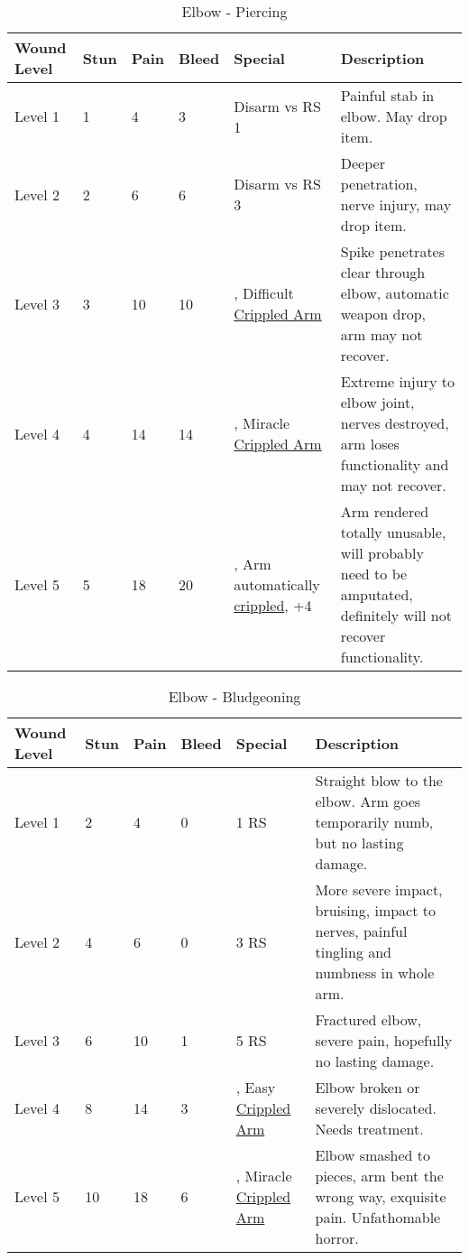\documentclass[oneside,11pt,english]{book}
\begin{document}
\begin{table}[!hb] %
	\caption{Elbow - Piercing}
	\label{wound:Elbow - Piercing}
	\begin{tabu} to 
Wound Level &Stun &Pain &Bleed &Special &Description\\\toprule
Level 1& 1& 4& 3& Disarm vs RS 1 &Painful stab in elbow. May drop item.\\
Level 2& 2& 6& 6& Disarm vs RS 3 &Deeper penetration, nerve injury, may drop item.\\
Level 3& 3& 10& 10& , \newline
	Difficult~ \hyperref[bane:Crippled Limb/Appendage]{Crippled Arm} &Spike penetrates clear through elbow, automatic weapon drop, arm may not recover.\\
Level 4& 4& 14& 14& , \newline
	Miracle~ \hyperref[bane:Crippled Limb/Appendage]{Crippled Arm} &Extreme injury to elbow joint, nerves destroyed, arm loses functionality and may not recover.\\
Level 5& 5& 18& 20& , \newline
	Arm automatically \hyperref[bane:Crippled Limb/Appendage]{crippled}, \newline
	 +4 &Arm rendered totally unusable, will probably need to be amputated, definitely will not recover functionality.\\
	\end{tabu}
\end{table}

\begin{table}[!hb] %
	\caption{Elbow - Bludgeoning}
	\label{wound:Elbow - Bludgeoning}
	\begin{tabu} to 
Wound Level &Stun &Pain &Bleed &Special &Description\\\toprule
Level 1& 2& 4& 0&  1 RS &Straight blow to the elbow. Arm goes temporarily numb, but no lasting damage.\\
Level 2& 4& 6& 0&  3 RS &More severe impact, bruising, impact to nerves, painful tingling and numbness in whole arm.\\
Level 3& 6& 10& 1&  5 RS &Fractured elbow, severe pain, hopefully no lasting damage.\\
Level 4& 8& 14& 3& , \newline
	Easy~ \hyperref[bane:Crippled Limb/Appendage]{Crippled Arm} &Elbow broken or severely dislocated. Needs treatment.\\
Level 5& 10& 18& 6& , \newline
	Miracle~ \hyperref[bane:Crippled Limb/Appendage]{Crippled Arm} &Elbow smashed to pieces, arm bent the wrong way, exquisite pain. Unfathomable horror.\\
	\end{tabu}
\end{table}
\end{document}
